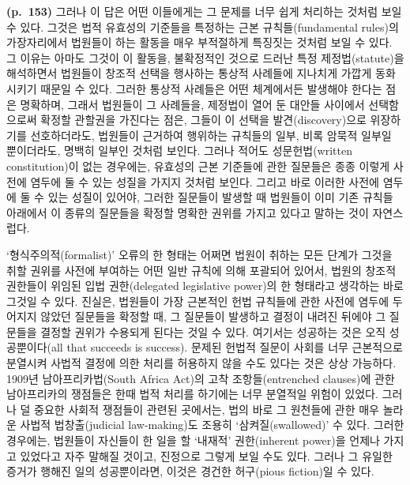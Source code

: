 \textbf{(p.~153)} 그러나 이 답은 어떤 이들에게는 그 문제를 너무 쉽게
처리하는 것처럼 보일 수 있다. 그것은 법적 유효성의 기준들을 특정하는
근본 규칙들(fundamental rules)의 가장자리에서 법원들이 하는 활동을 매우
부적절하게 특징짓는 것처럼 보일 수 있다. 그 이유는 아마도 그것이 이
활동을, 불확정적인 것으로 드러난 특정 제정법(statute)을 해석하면서
법원들이 창조적 선택을 행사하는 통상적 사례들에 지나치게 가깝게
동화시키기 때문일 수 있다. 그러한 통상적 사례들은 어떤 체계에서든
발생해야 한다는 점은 명확하며, 그래서 법원들이 그 사례들을, 제정법이
열어 둔 대안들 사이에서 선택함으로써 확정할 관할권을 가진다는 점은,
그들이 이 선택을 발견(discovery)으로 위장하기를 선호하더라도, 법원들이
근거하여 행위하는 규칙들의 일부, 비록 암묵적 일부일 뿐이더라도, 명백히
일부인 것처럼 보인다. 그러나 적어도 성문헌법(written constitution)이
없는 경우에는, 유효성의 근본 기준들에 관한 질문들은 종종 이렇게 사전에
염두에 둘 수 있는 성질을 가지지  것처럼 보인다. 그리고
바로 이러한 사전에 염두에 둘 수 있는 성질이 있어야, 그러한 질문들이
발생할 때 법원들이 이미 기존 규칙들 아래에서 이 종류의 질문들을 확정할
명확한 권위를 가지고 있다고 말하는 것이 자연스럽다.

‘형식주의적(formalist)’ 오류의 한 형태는 어쩌면 법원이 취하는 모든
단계가 그것을 취할 권위를 사전에 부여하는 어떤 일반 규칙에 의해 포괄되어
있어서, 법원의 창조적 권한들이  위임된 입법
권한(delegated legislative power)의 한 형태라고 생각하는 바로 그것일 수
있다. 진실은, 법원들이 가장 근본적인 헌법 규칙들에 관한 사전에 염두에
두어지지 않았던 질문들을 확정할 때, 그 질문들이 발생하고 결정이 내려진
뒤에야 그 질문들을 결정할 권위가 수용되게 된다는 것일 수 있다. 여기서는
성공하는 것은 오직 성공뿐이다(all that succeeds is success). 문제된
헌법적 질문이 사회를 너무 근본적으로 분열시켜 사법적 결정에 의한 처리를
허용하지 않을 수도 있다는 것은 상상 가능하다. 1909년 남아프리카법(South
Africa Act)의 고착 조항들(entrenched clauses)에 관한 남아프리카의
쟁점들은 한때 법적 처리를 하기에는 너무 분열적일 위험이 있었다. 그러나
덜 중요한 사회적 쟁점들이 관련된 곳에서는, 법의 바로 그 원천들에 관한
매우 놀라운 사법적 법창출(judicial law-making)도 조용히
‘삼켜질(swallowed)’ 수 있다. 그러한 경우에는,
 법원들이 자신들이 한 일을 할 ‘내재적’
권한(inherent power)을 언제나 가지고 있었다고 자주 말해질 것이고,
진정으로 그렇게 보일 수도 있다. 그러나 그 유일한 증거가 행해진 일의
성공뿐이라면, 이것은 경건한 허구(pious fiction)일 수 있다.

